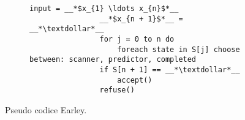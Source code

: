 \documentclass{subfiles}
\begin{document}
\begin{figure}[h!]
    \centering
    \begin{subfigure}[b]{0.53\textwidth}
        \begin{lstlisting}[language = PSEUDO]
                input = __*$x_{1} \ldots x_{n}$*__
                __*$x_{n + 1}$*__ = __*\textdollar*__
                for j = 0 to n do
                    foreach state in S[j] choose between: scanner, predictor, completed
                if S[n + 1] == __*\textdollar*__
                    accept()
                refuse()
            \end{lstlisting}
    \end{subfigure}
    \caption{Pseudo codice Earley.}
    \label{fig:2}
\end{figure}
\end{document}

